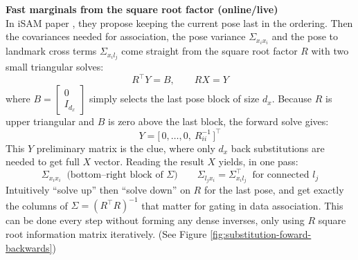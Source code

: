 \noindent
\textbf{Fast marginals from the square root factor (online/live)} 
\\ \noindent
In iSAM paper \cite{iSAM_paper}, they propose keeping the current pose last in the ordering. Then the covariances needed for association, the pose variance $\Sigma_{x_i x_i}$ and the pose to landmark cross terms $\Sigma_{x_i l_j}$ come straight from the square root factor $R$ with two small triangular solves:
$$
    R^\top Y = B,\qquad R X = Y
$$
where $B=\begin{bmatrix}0\\ I_{d_x}\end{bmatrix}$ simply selects the last pose block of size $d_x$. Because $R$ is upper triangular and $B$ is zero above the last block, the forward solve gives:
$$
Y=\big[\,0,\ldots,0,\ R_{ii}^{-1}\,\big]^\top
$$
This $Y$ preliminary matrix is the clue, where only $d_x$ back substitutions are needed to get full $X$ vector. Reading the result $X$ yields, in one pass:
$$
\Sigma_{x_i x_i} \;\; \text{(bottom–right block of } \Sigma)\qquad
\Sigma_{l_j x_i}=\Sigma_{x_i l_j}^\top \;\; \text{for connected } l_j
$$
Intuitively ``solve up'' then ``solve down'' on $R$ for the last pose, and get exactly the columns of $\Sigma=(R^\top R)^{-1}$ that matter for gating in data association. This can be done every step without forming any dense inverses, only using $R$ square root information matrix iteratively. (See Figure \ref{fig:substitution-foward-backwards})
